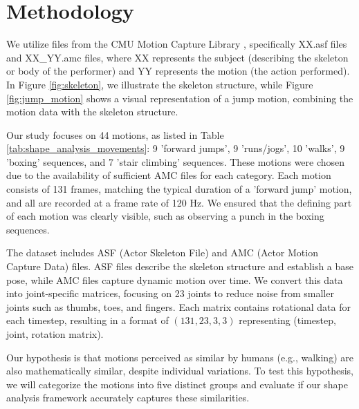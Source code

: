 \section{Methodology}
\label{sec:motion-capture-data-methodology}

We utilize files from the CMU Motion Capture Library \cite{CarnegieMellonUniversity}, specifically XX.asf files and XX\_YY.amc files, where XX represents the subject (describing the skeleton or body of the performer) and YY represents the motion (the action performed). In Figure \ref{fig:skeleton}, we illustrate the skeleton structure, while Figure \ref{fig:jump_motion} shows a visual representation of a jump motion, combining the motion data with the skeleton structure.

Our study focuses on 44 motions, as listed in Table \ref{tab:shape_analysis_movements}: 9 'forward jumps', 9 'runs/jogs', 10 'walks', 9 'boxing' sequences, and 7 'stair climbing' sequences. These motions were chosen due to the availability of sufficient AMC files for each category. Each motion consists of 131 frames, matching the typical duration of a 'forward jump' motion, and all are recorded at a frame rate of 120 Hz. We ensured that the defining part of each motion was clearly visible, such as observing a punch in the boxing sequences.

The dataset includes ASF (Actor Skeleton File) and AMC (Actor Motion Capture Data) files. ASF files describe the skeleton structure and establish a base pose, while AMC files capture dynamic motion over time. We convert this data into joint-specific matrices, focusing on 23 joints to reduce noise from smaller joints such as thumbs, toes, and fingers. Each matrix contains rotational data for each timestep, resulting in a format of \((131, 23, 3, 3)\) representing (timestep, joint, rotation matrix).

Our hypothesis is that motions perceived as similar by humans (e.g., walking) are also mathematically similar, despite individual variations. To test this hypothesis, we will categorize the motions into five distinct groups and evaluate if our shape analysis framework accurately captures these similarities.

